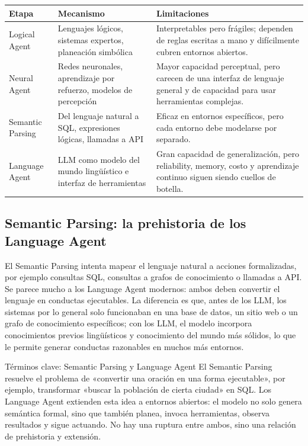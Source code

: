 \documentclass[a4paper]{article}
\begin{document}
\noindent\begin{tabularx}{\textwidth}{p{}p{}X}
\toprule
Etapa & Mecanismo & Limitaciones \\
\midrule
Logical Agent & Lenguajes lógicos, sistemas expertos, planeación simbólica & Interpretables pero frágiles; dependen de reglas escritas a mano y difícilmente cubren entornos abiertos. \\
Neural Agent & Redes neuronales, aprendizaje por refuerzo, modelos de percepción & Mayor capacidad perceptual, pero carecen de una interfaz de lenguaje general y de capacidad para usar herramientas complejas. \\
Semantic Parsing & Del lenguaje natural a SQL, expresiones lógicas, llamadas a API & Eficaz en entornos específicos, pero cada entorno debe modelarse por separado. \\
Language Agent & LLM como modelo del mundo lingüístico e interfaz de herramientas & Gran capacidad de generalización, pero reliability, memory, costo y aprendizaje continuo siguen siendo cuellos de botella. \\
\bottomrule
\end{tabularx}

\subsection{Semantic Parsing: la prehistoria de los Language Agent}

El Semantic Parsing intenta mapear el lenguaje natural a acciones formalizadas, por ejemplo consultas SQL, consultas a grafos de conocimiento o llamadas a API. Se parece mucho a los Language Agent modernos: ambos deben convertir el lenguaje en conductas ejecutables. La diferencia es que, antes de los LLM, los sistemas por lo general solo funcionaban en una base de datos, un sitio web o un grafo de conocimiento específicos; con los LLM, el modelo incorpora conocimientos previos lingüísticos y conocimiento del mundo más sólidos, lo que le permite generar conductas razonables en muchos más entornos.

\begin{knowledgebox}{Términos clave: Semantic Parsing y Language Agent}
El Semantic Parsing resuelve el problema de «convertir una oración en una forma ejecutable», por ejemplo, transformar «buscar la población de cierta ciudad» en SQL. Los Language Agent extienden esta idea a entornos abiertos: el modelo no solo genera semántica formal, sino que también planea, invoca herramientas, observa resultados y sigue actuando. No hay una ruptura entre ambos, sino una relación de prehistoria y extensión.
\end{knowledgebox}
\end{document}
